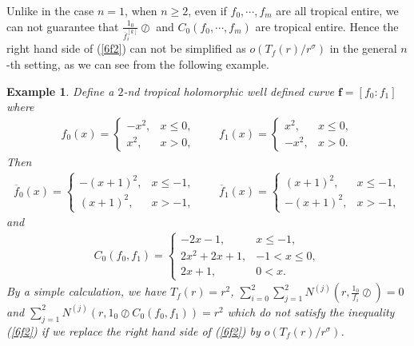 \documentclass{article}
\newtheorem{exa}[defin]{Example}
\begin{document}
Unlike in the case $n=1$, when $n\geq 2$, even if $f_{0}, \cdots, f_{m}$ are all tropical entire, we can not guarantee that $\frac{1_{0}}{\overline{f}_{i}^{[k]}}\oslash$ and $C_{0}(f_{0}, \cdots, f_{m})$ are tropical entire. Hence the right hand side of (\ref{6f2}) can not be simplified as $o(T_{f}(r)/r^{\sigma})$ in the general $n$-th setting, as we can see from the following example.
\begin{exa}
    Define a $2$-nd tropical holomorphic well defined curve $\textbf{f}=[f_{0}: f_{1}]$ where
    \begin{eqnarray*}
        f_{0}(x)=\left\{\begin{array}{ll}
         -x^{2}, & x\leq 0,\\
         x^{2}, & x>0,
         \end{array}\right. \qquad f_{1}(x)=\left\{\begin{array}{ll}
         x^{2}, & x\leq 0,\\
         -x^{2}, & x>0.
         \end{array}\right.
    \end{eqnarray*}
    Then
    \begin{eqnarray*}
        \overline{f}_{0}(x)=\left\{\begin{array}{ll}
         -(x+1)^{2}, & x\leq -1,\\
         (x+1)^{2}, & x>-1,
         \end{array}\right. \qquad \overline{f}_{1}(x)=\left\{\begin{array}{ll}
         (x+1)^{2}, & x\leq -1,\\
         -(x+1)^{2}, & x>-1,
         \end{array}\right.
    \end{eqnarray*}
    and
    \begin{eqnarray*}
        C_{0}(f_{0}, f_{1})=\left\{\begin{array}{ll}
         -2x-1, & x\leq -1,\\
         2x^{2}+2x+1, & -1<x\leq 0,\\
         2x+1, & 0<x.
         \end{array}\right.
    \end{eqnarray*}
    By a simple calculation, we have $T_{f}(r)=r^{2}$, $\sum_{i=0}^{2}\sum_{j=1}^{2}N^{(j)}\left(r, \frac{1_{0}}{f_{i}}\oslash\right)=0$ and $\sum_{j=1}^{2}N^{(j)}(r, 1_{0}\oslash C_{0}(f_{0}, f_{1}))=r^{2}$ which do not satisfy the inequality (\ref{6f2}) if we replace the right hand side of (\ref{6f2}) by $o(T_{f}(r)/r^{\sigma})$.
\end{exa}
\end{document}
